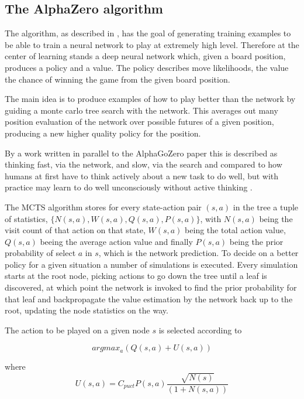 \documentclass[12pt,onecolumn,oneside,titlepage]{article}
\begin{document}
\subsection{The AlphaZero algorithm}

The algorithm, as described in \cite{silver2018general}, has the goal of generating training examples to be able to train a neural network to play at extremely high level. 
Therefore at the center of learning stands a deep neural network which, given a board position, produces a policy and a value.
The policy describes move likelihoods, the value the chance of winning the game from the given board position.

The main idea is to produce examples of how to play better than the network by guiding a monte carlo tree search with the network. This averages out many position evaluation of the network over possible futures of a given position, producing a new higher quality policy for
the position.

By a work written in parallel to the AlphaGoZero paper this is described as thinking fast, via the network, and slow, 
via the search and compared to how humans at first have to think actively about a new task to do well, but with practice may learn to do well unconsciously without active thinking \cite{anthony2017thinking}.

The MCTS algorithm stores for every state-action pair $(s,a)$ in the tree a tuple of statistics, $\{N(s,a), W(s,a), Q(s,a), P(s,a)\}$, with $N(s,a)$ being the visit count of that action on that state,
$W(s,a)$ being the total action value, $Q(s,a)$ beeing the average action value and finally $P(s,a)$ being the prior probability of select $a$ in $s$, which is the network prediction.
To decide on a better policy for a given situation a number of simulations is executed. Every simulation starts at the root node, picking actions to go down the tree until a leaf is discovered, at which point the network is invoked to find the prior probability
for that leaf and backpropagate the value estimation by the network back up to the root, updating the node statistics on the way.

The action to be played on a given node $s$ is selected according to 

\begin{equation}
 argmax_a(Q(s, a) + U(s, a))
\end{equation}

where
\begin{equation}
 U(s,a) = C_{puct} P(s,a) \frac{\sqrt{N(s)}}{(1+N(s,a))}
\end{equation}
\end{document}
